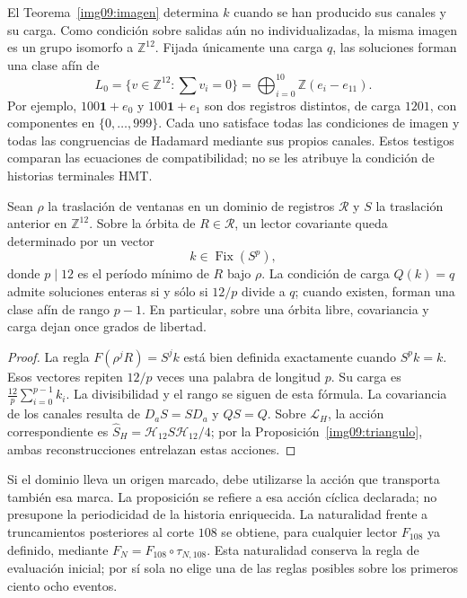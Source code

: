 El Teorema~\ref{img09:imagen} determina $k$ cuando se han producido
sus canales y su carga. Como condición sobre salidas aún no
individualizadas, la misma imagen es un grupo isomorfo a
$\mathbb Z^{12}$. Fijada únicamente una carga $q$, las soluciones
forman una clase afín de
\[
 L_0=\{v\in\mathbb Z^{12}:\sum v_i=0\}
 =\bigoplus_{i=0}^{10}\mathbb Z(e_i-e_{11}).
\]
Por ejemplo, $100\mathbf1+e_0$ y $100\mathbf1+e_1$ son dos
registros distintos, de carga $1201$, con componentes en
$\{0,\ldots,999\}$. Cada uno satisface todas las condiciones de
imagen y todas las congruencias de Hadamard mediante sus propios
canales. Estos testigos comparan las ecuaciones de compatibilidad;
no se les atribuye la condición de historias terminales HMT.

\begin{proposition}
\label{img09:covariancia}
Sean $\rho$ la traslación de ventanas en un dominio de registros
$\mathscr R$ y $S$ la traslación anterior en $\mathbb Z^{12}$.
Sobre la órbita de $R\in\mathscr R$, un lector covariante queda
determinado por un vector
\[
 k\in\operatorname{Fix}(S^p),
\]
donde $p\mid12$ es el período mínimo de $R$ bajo $\rho$.
La condición de carga $Q(k)=q$ admite soluciones enteras si y sólo si
$12/p$ divide a $q$; cuando existen, forman una clase afín de rango
$p-1$. En particular, sobre una órbita libre, covariancia y carga
dejan once grados de libertad.
\end{proposition}
\begin{proof}
La regla $F(\rho^jR)=S^jk$ está bien definida exactamente cuando
$S^pk=k$. Esos vectores repiten $12/p$ veces una palabra de
longitud $p$. Su carga es $\frac{12}{p}\sum_{i=0}^{p-1}k_i$.
La divisibilidad y el rango se siguen de esta fórmula. La
covariancia de los canales resulta de $D_aS=SD_a$ y $QS=Q$.
Sobre $\mathcal L_H$, la acción correspondiente es
$\widehat S_H=\mathcal H_{12}S\mathcal H_{12}/4$;
por la Proposición~\ref{img09:triangulo}, ambas reconstrucciones
entrelazan estas acciones.
\end{proof}

Si el dominio lleva un origen marcado, debe utilizarse la acción que
transporta también esa marca. La proposición se refiere a esa acción
cíclica declarada; no presupone la periodicidad de la historia
enriquecida. La naturalidad frente a truncamientos posteriores al corte
$108$ se obtiene, para cualquier lector $F_{108}$ ya definido, mediante
$F_N=F_{108}\circ\tau_{N,108}$. Esta naturalidad conserva la regla
de evaluación inicial; por sí sola no elige una de las reglas posibles
sobre los primeros ciento ocho eventos.

